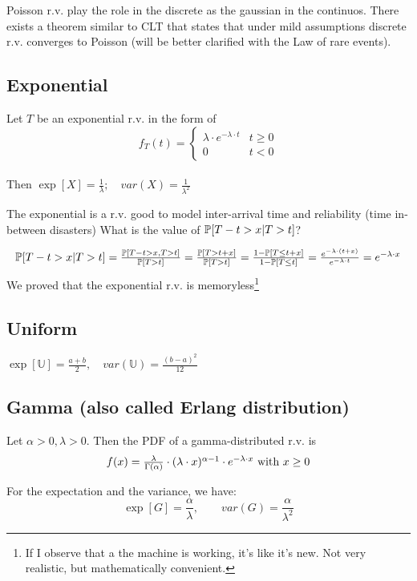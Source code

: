 Poisson r.v. play the role in the discrete as the gaussian in the continuos. There exists a theorem similar to CLT that states that under mild assumptions discrete r.v. converges to Poisson (will be better clarified with the Law of rare events).

\subsection{Exponential}
Let $T$ be an exponential r.v. in the form of
$$f_T(t)=
\begin{cases}
  \lambda \cdot e^{-\lambda \cdot t} & t \ge 0 \\
  0 & t <0
\end{cases}
$$
\\
Then $\exp[X]= \frac{1}{\lambda}; \quad var(X)=\frac{1}{\lambda^2}$

The exponential is a r.v. good to model inter-arrival time and reliability (time in-between disasters)
What is the value of $\mathbb{P}[T-t > x | T>t]$?

\begin{equation}
  $$\prob[T-t > x | T>t]=\frac{\prob[T-t > x , T>t]}{\prob[T>t]}=\frac{\prob[T > t+x ]}{\prob[T>t]}=\frac{1-\prob[T \le t+x]}{1-\prob[T\le t]}=\frac{e^{-\lambda \cdot (t+x)}}{e^{-\lambda \cdot t}} = e^{-\lambda \cdot x}$$
\end{equation}
We proved that the exponential r.v. is memoryless\footnote{If I observe that a the machine is working, it's like it's new. Not very realistic, but mathematically convenient.}

\subsection{Uniform}
$\exp[\mathbb{U}]=\frac{a+b}{2},\quad var(\mathbb{U})=\frac{(b-a)^2}{12}$


\subsection{Gamma (also called Erlang distribution)}
Let $\alpha >0 , \lambda >0$. Then the PDF of a gamma-distributed r.v. is
\begin{equation}
  $$f(x) = \frac{\lambda}{\Gamma(\alpha)}\cdot (\lambda \cdot x)^{\alpha -1} \cdot e^{-\lambda \cdot x} \text{ with } x\ge 0$$
\end{equation}

For the expectation and the variance, we have: $$\exp[G]=\frac{\alpha}{\lambda}, \qquad var(G)=\frac{\alpha}{\lambda^2}$$

